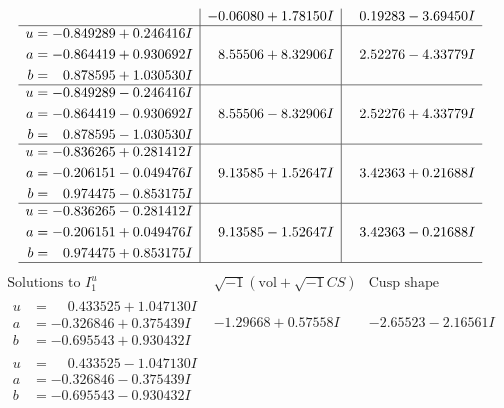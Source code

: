 \documentclass[1p]{elsarticle_modified}
\theoremstyle{definition}
\newcommand{\I}{\sqrt{-1}}
\begin{document}
$$\begin{array}{c|c|c}
 & -0.06080 + 1.78150 I & \phantom{-}0.19283 - 3.69450 I \\ \hline\begin{aligned}
u &= -0.849289 + 0.246416 I \\
a &= -0.864419 + 0.930692 I \\
b &= \phantom{-}0.878595 + 1.030530 I\end{aligned}
 & \phantom{-}8.55506 + 8.32906 I & \phantom{-}2.52276 - 4.33779 I \\ \hline\begin{aligned}
u &= -0.849289 - 0.246416 I \\
a &= -0.864419 - 0.930692 I \\
b &= \phantom{-}0.878595 - 1.030530 I\end{aligned}
 & \phantom{-}8.55506 - 8.32906 I & \phantom{-}2.52276 + 4.33779 I \\ \hline\begin{aligned}
u &= -0.836265 + 0.281412 I \\
a &= -0.206151 - 0.049476 I \\
b &= \phantom{-}0.974475 - 0.853175 I\end{aligned}
 & \phantom{-}9.13585 + 1.52647 I & \phantom{-}3.42363 + 0.21688 I \\ \hline\begin{aligned}
u &= -0.836265 - 0.281412 I \\
a &= -0.206151 + 0.049476 I \\
b &= \phantom{-}0.974475 + 0.853175 I\end{aligned}
 & \phantom{-}9.13585 - 1.52647 I & \phantom{-}3.42363 - 0.21688 I\\
 \hline 
 \end{array}$$\newpage$$\begin{array}{c|c|c}  
\text{Solutions to }I^u_{1}& \I (\text{vol} + \sqrt{-1}CS) & \text{Cusp shape}\\
 \hline 
\begin{aligned}
u &= \phantom{-}0.433525 + 1.047130 I \\
a &= -0.326846 + 0.375439 I \\
b &= -0.695543 + 0.930432 I\end{aligned}
 & -1.29668 + 0.57558 I & -2.65523 - 2.16561 I \\ \hline\begin{aligned}
u &= \phantom{-}0.433525 - 1.047130 I \\
a &= -0.326846 - 0.375439 I \\
b &= -0.695543 - 0.930432 I\end{aligned}

\end{array}$$
\end{document}
